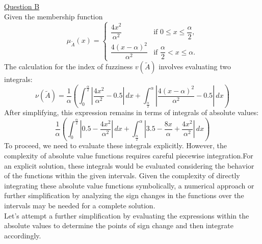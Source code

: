 \underline{Question B}\\
Given the membership function 
\begin{equation}
	\mu_{\tilde{A}}(x) = 
		 \begin{cases} 
			\dfrac{4x^2}{\alpha^2} & \text{if } 0 \leq x \leq \dfrac{\alpha}{2}, \\
			\dfrac{4(x-\alpha)^2}{\alpha^2} & \text{if } \dfrac{\alpha}{2} < x \leq \alpha.
		\end{cases}
\end{equation}
The calculation for the index of fuzziness $v(\tilde{A})$ involves evaluating two integrals:
\begin{equation}
	\nu(\tilde{A}) = \frac{1}{\alpha} \left( \int_{0}^{\frac{\alpha}{2}} \left| \frac{4x^2}{\alpha^2} - 0.5 \right| \, dx + \int_{\frac{\alpha}{2}}^{\alpha} \left| \frac{4(x-\alpha)^2}{\alpha^2} - 0.5 \right| \, dx \right)
\end{equation}
After simplifying, this expression remains in terms of integrals of absolute values:
\begin{equation}
	\frac{1}{\alpha} \left( \int_{0}^{\frac{\alpha}{2}} \left| 0.5 - \frac{4x^2}{\alpha^2} \right| \, dx + \int_{\frac{\alpha}{2}}^{\alpha} \left| 3.5 - \frac{8x}{\alpha} + \frac{4x^2}{\alpha^2} \right| \, dx \right)
\end{equation}
To proceed, we need to evaluate these integrals explicitly. However, the complexity of absolute value functions requires careful piecewise integration.For an explicit solution, these integrals would be evaluated considering the behavior of the functions within the given intervals. Given the complexity of directly integrating these absolute value functions symbolically, a numerical approach or further simplification by analyzing the sign changes in the functions over the intervals may be needed for a complete solution.\\

Let's attempt a further simplification by evaluating the expressions within the absolute values to determine the points of sign change and then integrate accordingly. ​\\


